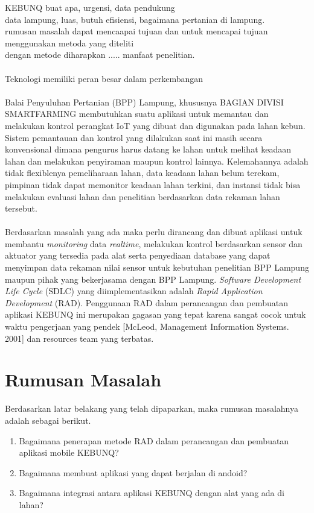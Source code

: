 \begin{flushleft}
\begin{justify}
  KEBUNQ buat apa, urgensi, data pendukung\\
  data lampung, luas, butuh efisiensi, bagaimana pertanian di lampung.\\
  rumusan masalah dapat mencaapai tujuan dan untuk mencapai tujuan menggunakan metoda yang diteliti\\
  dengan metode diharapkan ..... manfaat penelitian.
  \\
  \\
  Teknologi memiliki peran besar dalam perkembangan
  \\
  \\
  Balai Penyuluhan Pertanian (BPP) Lampung, khususnya BAGIAN DIVISI SMARTFARMING membutuhkan suatu aplikasi untuk memantau dan melakukan kontrol
  perangkat IoT yang dibuat dan digunakan pada lahan kebun. Sistem pemantauan dan kontrol yang dilakukan saat ini
  masih secara konvensional dimana pengurus harus datang ke lahan untuk melihat keadaan lahan dan melakukan penyiraman maupun kontrol lainnya. Kelemahannya adalah tidak flexiblenya pemeliharaan lahan, data keadaan lahan belum terekam,
  pimpinan tidak dapat memonitor keadaan lahan terkini, dan instansi tidak bisa melakukan evaluasi lahan dan penelitian berdasarkan data rekaman lahan tersebut.
  \\
  \\
  Berdasarkan masalah yang ada maka perlu dirancang dan dibuat aplikasi untuk membantu
\textit{monitoring} data \textit{realtime}, melakukan kontrol berdasarkan sensor dan aktuator yang tersedia pada alat serta penyediaan database yang dapat menyimpan data rekaman nilai sensor untuk kebutuhan
penelitian BPP Lampung maupun pihak yang bekerjasama dengan BPP Lampung. \textit{Software Development Life Cycle} (SDLC) yang diimplementasikan adalah
\textit{Rapid Application Development} (RAD). Penggunaan RAD dalam perancangan dan pembuatan aplikasi KEBUNQ ini merupakan gagasan yang tepat karena sangat cocok untuk 
waktu pengerjaan yang pendek [McLeod, Management Information Systems. 2001] dan resources team yang terbatas.

\end{justify}
\vspace{1cm}   

\section{Rumusan Masalah}
\begin{justify}
  Berdasarkan latar belakang yang telah dipaparkan, maka rumusan masalahnya adalah sebagai berikut.
\end{justify}
\begin{enumerate}
  \item Bagaimana penerapan metode RAD dalam perancangan dan pembuatan aplikasi mobile KEBUNQ?
  \item Bagaimana membuat aplikasi yang dapat berjalan di andoid?
  \item Bagaimana integrasi antara aplikasi KEBUNQ dengan alat yang ada di lahan?
  

\end{enumerate}
\end{flushleft}
